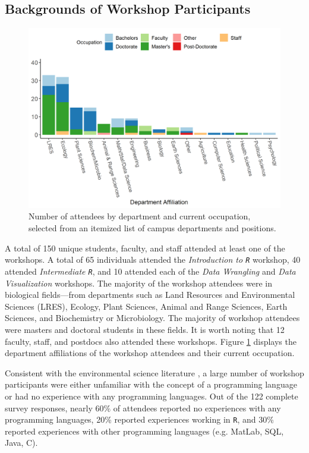 \documentclass[12pt]{article}
\begin{document}
\subsection{Backgrounds of Workshop Participants}

{
\begin{figure}[h!]
\centering
\includegraphics[width = \textwidth]{images/better_colors_attendance.png}
\caption{Number of attendees by department and current occupation, selected from
an itemized list of campus departments and positions.}
    \label{fig:departments}
\end{figure}
}

\quad A total of 150 unique students, faculty, and staff attended at
least one of the workshops. A total of 65 individuals attended the 
\emph{Introduction to \texttt{R}} workshop, 40 attended \emph{Intermediate 
\texttt{R}}, and 10 attended each of the \emph{Data Wrangling} and \emph{Data
Visualization} workshops. The majority of the workshop attendees were in 
biological fields---from departments such as Land Resources and Environmental
Sciences (LRES), Ecology, Plant Sciences, Animal and Range Sciences, Earth
Sciences, and Biochemistry or Microbiology. The majority of workshop attendees
were masters and doctoral students in these fields. It is worth noting that 12
faculty, staff, and postdocs also attended these workshops. Figure 
\ref{fig:departments} displays the department affiliations of the workshop
attendees and their current occupation. 

\quad Consistent with the environmental science literature \citep{andelman, 
hampton, hernandez, datacarpentry}, a large number of workshop participants were
either unfamiliar with the concept of a programming language or had no
experience with any programming languages. Out of the 122 complete survey
responses, nearly 60\% of attendees reported no experiences with any programming
languages, 20\% reported experiences working in \texttt{R}, and 30\% reported
experiences with other programming languages (e.g. MatLab, SQL, Java, C). 
\end{document}
